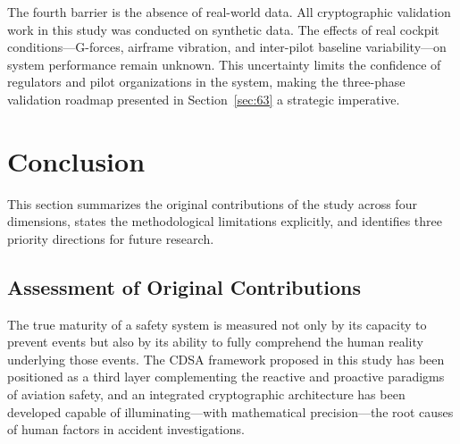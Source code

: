\documentclass[12pt,a4paper]{article}
\begin{document}
The fourth barrier is the absence of real-world data. All cryptographic validation work in this
study was conducted on synthetic data. The effects of real cockpit conditions---G-forces,
airframe vibration, and inter-pilot baseline variability---on system performance remain unknown.
This uncertainty limits the confidence of regulators and pilot organizations in the system,
making the three-phase validation roadmap presented in Section~\ref{sec:63} a strategic imperative.

\section{Conclusion}
\label{sec:conclusion}

This section summarizes the original contributions of the study across four dimensions, states
the methodological limitations explicitly, and identifies three priority directions for future research.

\subsection{Assessment of Original Contributions}

The true maturity of a safety system is measured not only by its capacity to prevent events but
also by its ability to fully comprehend the human reality underlying those events. The CDSA
framework proposed in this study has been positioned as a third layer complementing the reactive
and proactive paradigms of aviation safety, and an integrated cryptographic architecture has been
developed capable of illuminating---with mathematical precision---the root causes of human factors
in accident investigations.
\end{document}
